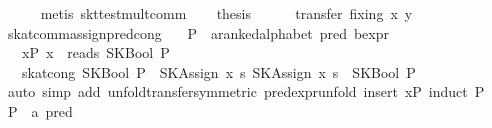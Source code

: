 \begin{isabellebody}
\ \ \ \ \isamarkupfalse%
\ {}metis\ skt{}test{}mult{}comm{}\isanewline
\ \ \isamarkupfalse%
\ {}thesis\isanewline
\ \ \ \ \isamarkupfalse%
\ {}transfer\ fixing{}\ x\ y{}\isanewline
{}\isamarkupfalse%
%
\endisatagproof
{\isafoldproof}%
%
\isadelimproof
\isanewline
%
\endisadelimproof
\isanewline
{}\isamarkupfalse%
\ skat{}comm{}assign{}pred{}cong{}\isanewline
\ \ \ P\ {}{}\ {}{}a{}{}ranked{}alphabet\ pred\ bexpr{}\isanewline
\ \ \ xP{}\ {}x\ {}\ reads\ {}SKBool\ P{}{}\isanewline
\ \ \ {}skat{}cong\ {}SKBool\ P\ {}\ SKAssign\ x\ s{}\ {}SKAssign\ x\ s\ {}\ SKBool\ P{}{}\isanewline
%
\isadelimproof
%
\endisadelimproof
%
\isatagproof
{}\isamarkupfalse%
\ {}auto\ simp\ add{}\ unfold{}transfer{}symmetric{}\ pred{}expr{}unfold{}\ insert\ xP{}\ induct\ P{}\isanewline
\ \ \isamarkupfalse%
\ P\ {}{}\ {}{}a\ pred{}\ \isamarkupfalse%

\end{isabellebody}
